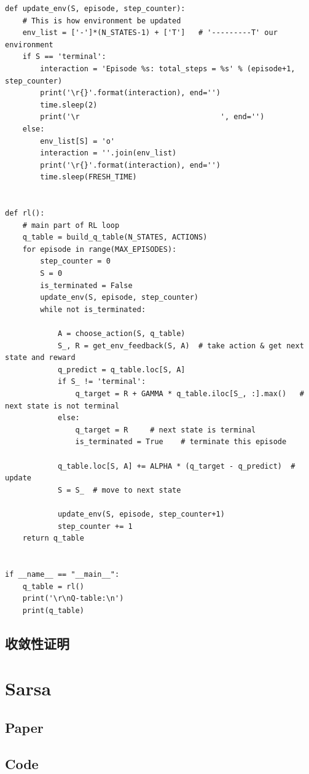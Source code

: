\documentclass{book}
\begin{document}
\begin{lstlisting}
def update_env(S, episode, step_counter):
    # This is how environment be updated
    env_list = ['-']*(N_STATES-1) + ['T']   # '---------T' our environment
    if S == 'terminal':
        interaction = 'Episode %s: total_steps = %s' % (episode+1, step_counter)
        print('\r{}'.format(interaction), end='')
        time.sleep(2)
        print('\r                                ', end='')
    else:
        env_list[S] = 'o'
        interaction = ''.join(env_list)
        print('\r{}'.format(interaction), end='')
        time.sleep(FRESH_TIME)


def rl():
    # main part of RL loop
    q_table = build_q_table(N_STATES, ACTIONS)
    for episode in range(MAX_EPISODES):
        step_counter = 0
        S = 0
        is_terminated = False
        update_env(S, episode, step_counter)
        while not is_terminated:

            A = choose_action(S, q_table)
            S_, R = get_env_feedback(S, A)  # take action & get next state and reward
            q_predict = q_table.loc[S, A]
            if S_ != 'terminal':
                q_target = R + GAMMA * q_table.iloc[S_, :].max()   # next state is not terminal
            else:
                q_target = R     # next state is terminal
                is_terminated = True    # terminate this episode

            q_table.loc[S, A] += ALPHA * (q_target - q_predict)  # update
            S = S_  # move to next state

            update_env(S, episode, step_counter+1)
            step_counter += 1
    return q_table


if __name__ == "__main__":
    q_table = rl()
    print('\r\nQ-table:\n')
    print(q_table)
\end{lstlisting}
\subsection{收敛性证明}
\section{Sarsa}
\subsection{Paper}
\subsection{Code}
\end{document}
